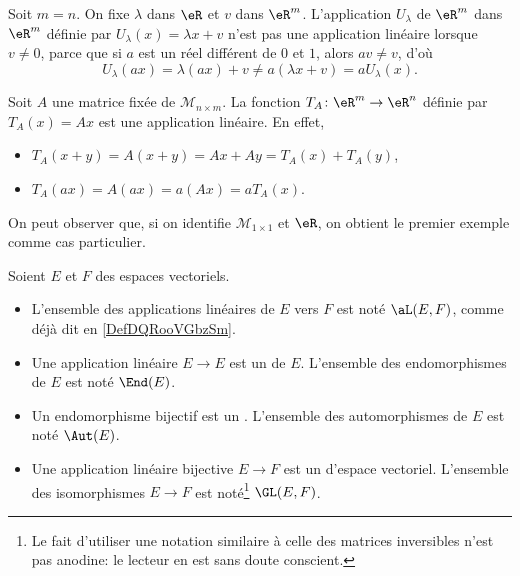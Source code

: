 \begin{example}\label{ex_affine}
	Soit $m=n$. On fixe $\lambda$ dans $\eR$ et $v$ dans $\eR^m$. L'application $U_{\lambda}$ de $\eR^m$ dans $\eR^m$ définie par $U_{\lambda}(x)=\lambda x+v$ n'est pas une application linéaire lorsque \( v \neq 0 \), parce que si \( a \) est un réel différent de \(0 \) et \( 1 \), alors \( av \neq v \), d'où
\[
U_{\lambda}(ax)=\lambda(ax)+v\neq a(\lambda x+v) =a U_{\lambda}(x).
\]
\end{example}

\begin{example}\label{exampleT_A}
	Soit $A$ une matrice fixée de $\mathcal{M}_{n\times m}$. La fonction $T_A\colon \eR^m\to \eR^n$ définie par $T_A(x)=Ax$ est une application linéaire. En effet,
    \begin{itemize}
        \item  $T_A(x+y)= A(x+y)= Ax + Ay = T_A(x)+T_A(y)$,
        \item $T_A(ax)=A(ax)= a(Ax) = a T_A(x)$.
    \end{itemize}
\end{example}

On peut observer que, si on identifie $\mathcal{M}_{1\times 1}$ et $\eR$, on obtient le premier exemple comme cas particulier.

\begin{definition}      \label{DEFooOAOGooKuJSup}
    Soient \( E\) et \( F\) des espaces vectoriels.
    \begin{itemize}
        \item
            L'ensemble des applications linéaires de \( E\) vers \( F\) est noté $\aL(E,F)$, comme déjà dit en \ref{DefDQRooVGbzSm}.
        \item Une application linéaire \( E\to E\) est un  de \( E\). L'ensemble des endomorphismes de \( E\) est noté \( \End(E)\).
        \item Un endomorphisme bijectif est un . L'ensemble des automorphismes de \( E\) est noté \( \Aut(E)\).
        \item
            Une application linéaire bijective \( E\to F\) est un  d'espace vectoriel. L'ensemble des isomorphismes \( E\to F\) est noté\footnote{Le fait d'utiliser une notation similaire à celle des matrices inversibles n'est pas anodine: le lecteur en est sans doute conscient.} \( \GL(E,F)\).
    \end{itemize}
\end{definition}

